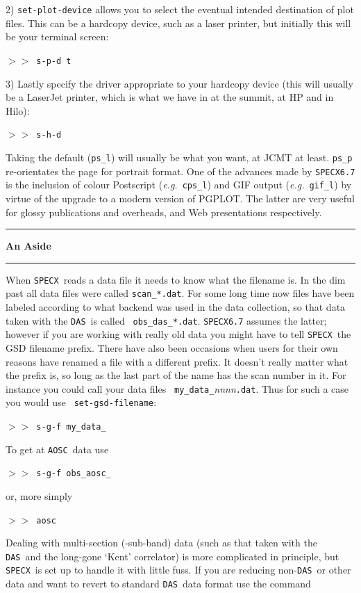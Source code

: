 \documentclass[11pt,twoside]{article}
\newcommand{\eg}{{\it e.g.}}
\newcommand{\SPECX}{{\tt SPECX}}
\newcommand{\das}{{\tt DAS}}
\newcommand{\aosc}{{\tt AOSC}}
\newcommand{\SP}{{$>\!>$}}
\newcommand{\aside}
{\begin{center}\rule[1mm]{1.0in}{0.015in}\hspace*{2mm}
{\bf An Aside}
\hspace*{2mm}\rule[1mm]{1.0in}{0.015in}\end{center}\vspace*{-0.2in}}
\begin{document}
2) {\tt set-plot-device} allows you to select the eventual intended
destination of plot files.  This can be a hardcopy device, such as a
laser printer, but initially this will be your terminal screen:

\SP\  {\tt s-p-d  t}

3) Lastly specify the driver appropriate to your hardcopy device (this
will usually be a LaserJet printer, which is what we have in at the
summit, at HP and in Hilo):

\SP\  {\tt s-h-d}

Taking the default ({\tt{ps\_l}}) will usually be what you want, at JCMT at
least. {\tt ps\_p} re-orientates the page for portrait format.  One of the
advances made by \SPECX {\tt 6.7} is the inclusion of colour Postscript
(\eg\ {\tt cps\_l}) and GIF output (\eg\ {\tt gif\_l}) by virtue of the
upgrade to a modern version of PGPLOT. The latter are very useful for
glossy publications and overheads, and Web presentations respectively.

\aside

When \SPECX\ reads a data file it needs to know what the filename is.  In
the dim past all data files were called {\tt scan\_*.dat}.  For some long
time now files have been labeled according to what backend was used in the
data collection, so that data taken with the \das\ is called {\tt
obs\_das\_*.dat}. \SPECX {\tt 6.7} assumes the latter; however if you are
working with really old data you might have to tell \SPECX\ the GSD
filename prefix. There have also been occasions when users for their own
reasons have renamed a file with a different prefix. It doesn't really
matter what the prefix is, so long as the last part of the name has the
scan number in it. For instance you could call your data files {\tt
my\_data\_}{\it nnnn}{\tt .dat}. Thus for such a case you would use {\tt
set-gsd-filename}:

\SP\ {\tt s-g-f my\_data\_}

To get at \aosc\ data use

\SP\ {\tt s-g-f obs\_aosc\_}

or, more simply

\SP\ {\tt aosc}

Dealing with multi-section (-sub-band) data (such as that taken with the
\das\ and the long-gone `Kent' correlator) is more complicated in
principle, but \SPECX\ is set up to handle it with little fuss. If you are
reducing non-\das\ or other data and want to revert to standard \das\ data
format use the command
\end{document}
